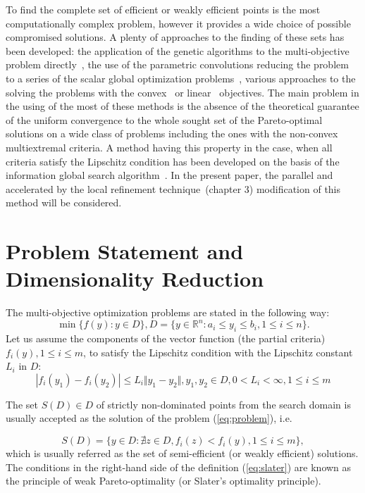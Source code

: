 \documentclass{llncs}
\begin{document}
To find the complete set of efficient or weakly efficient points is the most computationally
complex problem, however it provides a wide choice of possible compromised solutions. A
plenty of approaches to the finding of these sets has been developed: the application of the
genetic algorithms to the multi-objective problem directly~\cite{DebPratap2002}, the use of the
parametric convolutions reducing the problem to a series of the scalar global optimization
problems~\cite{GergelKozinov2017}, various approaches to the solving the problems with the
convex~\cite{ZhangZuo2013} or linear~\cite{Benson1998} objectives. The main problem in the
using of the most of these methods is the absence of the theoretical guarantee of the uniform
convergence to the whole sought set of the Pareto-optimal solutions on a wide class of
problems including the ones with the non-convex multiextremal criteria. A method having this
property in the case, when all criteria satisfy the Lipschitz condition has been developed on the
basis of the information global search algorithm~\cite{markinStrongin1993}. In the present
paper, the parallel and accelerated by the local refinement technique~\cite{strOptBook}(chapter
3) modification of this method will be considered.

\section{Problem Statement and Dimensionality Reduction}
The multi-objective optimization problems are stated in the following way:
\begin{equation}
  \label{eq:problem}
  \min\{f(y): y\in D\}, D=\{y\in \mathbb{R}^n: a_i \leqslant y_i \leqslant b_i, 1\leqslant i
\leqslant n \}.
\end{equation}
Let us assume the components of the vector function (the partial criteria) \(f_i(y), 1\leqslant
i\leqslant m\), to satisfy the Lipschitz condition with the Lipschitz constant \(L_i\) in \(D\):
\begin{displaymath}
\label{lip}
|f_i(y_1)-f_i(y_2)|\leqslant L_i\Vert y_1-y_2\Vert,y_1,y_2\in D,0<L_i<\infty,1\leqslant i
\leqslant m
\end{displaymath}

The set \(S(D)\in D\) of strictly non-dominated points from the search domain is usually accepted as the
solution of the problem (\ref{eq:problem}), i.e.

\begin{equation}
  \label{eq:slater}
  S(D) = \{y\in D: \nexists z\in D, f_i(z)<f_i(y),1\leqslant i \leqslant m\},
\end{equation}
which is usually referred as the set of semi-efficient (or weakly efficient) solutions. The
conditions in the right-hand side of the definition (\ref{eq:slater}) are known as the principle of
weak Pareto-optimality (or Slater's optimality principle).
\end{document}
